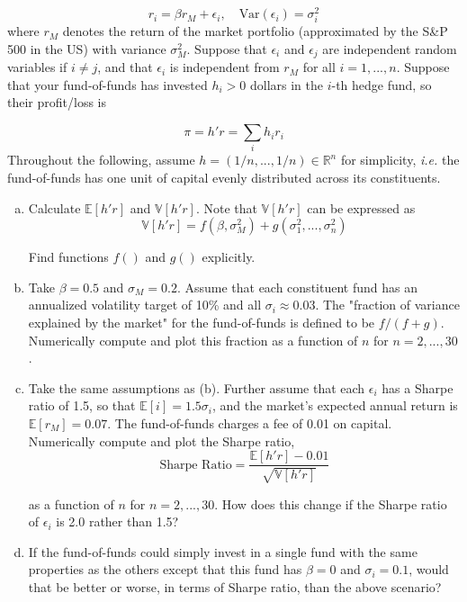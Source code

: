 \documentclass[a4paper]{article}
\begin{document}
\[r_i=\beta r_M+\epsilon_i,\quad \text{Var}(\epsilon_i)=\sigma_i^2\]
where $r_M$ denotes the return of the market portfolio (approximated by the S\&P 500 in the US) with variance $\sigma_M^2$. Suppose that $\epsilon_i$ and $\epsilon_j$ are independent random variables if $i\neq j$, and that $\epsilon_i$ is independent from $r_M$ for all $i=1,...,n$. Suppose that your fund-of-funds has invested $h_i>0$ dollars in the $i$-th hedge fund, so their profit/loss is

\[\pi=h'r=\sum_i{h_i r_i}\]
Throughout the following, assume $h=(1/n,...,1/n)\in\mathbb{R}^n$ for simplicity, \textit{i.e.} the fund-of-funds has one unit of capital evenly distributed across its constituents.\newline

\begin{enumerate}[(a)]
\item Calculate $\mathbb{E}[h'r]$ and $\mathbb{V}[h'r]$. Note that $\mathbb{V}[h'r]$ can be expressed as
\[\mathbb{V}[h'r]=f(\beta,\sigma_M^2)+g(\sigma_1^2,...,\sigma_n^2)\]

Find functions $f()$ and $g()$ explicitly.

\item Take $\beta=0.5$ and $\sigma_M=0.2$. Assume that each constituent fund has an annualized volatility target of 10\% and all $\sigma_i\approx 0.03$. The "fraction of variance explained by the market" for the fund-of-funds is defined to be $f/(f+g)$. Numerically compute and plot this fraction as a function of $n$ for $n=2,...,30$.

\item Take the same assumptions as (b). Further assume that each $\epsilon_i$ has a Sharpe ratio of 1.5, so that $\mathbb{E}[i]=1.5\sigma_i$, and the market's expected annual return is $\mathbb{E}[r_M]=0.07$. The fund-of-funds charges a fee of 0.01 on capital. Numerically compute and plot the Sharpe ratio, 
\[\text{Sharpe Ratio}=\frac{\mathbb{E}[h'r]-0.01}{\sqrt{\mathbb{V}[h'r]}}\]

as a function of $n$ for $n=2,...,30$. How does this change if the Sharpe ratio of $\epsilon_i$ is 2.0 rather than 1.5?

\item If the fund-of-funds could simply invest in a single fund with the same properties as the others except that this fund has $\beta=0$ and $\sigma_i=0.1$, would that be better or worse, in terms of Sharpe ratio, than the above scenario?
\end{enumerate}
\end{document}
